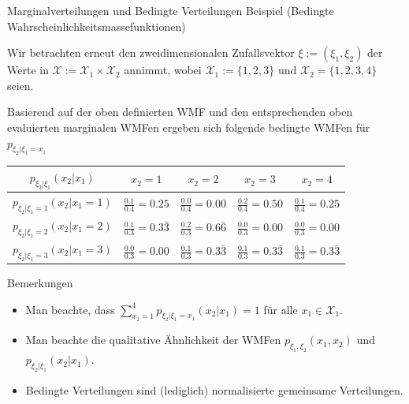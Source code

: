 \documentclass[
  8pt,
  ignorenonframetext,
]{beamer}
\providecommand{\tightlist}{%
  \setlength{\itemsep}{0pt}\setlength{\parskip}{0pt}}
\begin{document}
\begin{frame}{Marginalverteilungen und Bedingte Verteilungen}
\protect\hypertarget{marginalverteilungen-und-bedingte-verteilungen-5}{}
Beispiel (Bedingte Wahrscheinlichkeitsmassefunktionen)

\vspace{2mm}

\small
\justifying

Wir betrachten erneut den zweidimensionalen Zufallsvektor
\(\xi:= (\xi_1,\xi_2)\) der Werte in
\(\mathcal{X} := \mathcal{X}_1 \times \mathcal{X}_2\) annimmt, wobei
\(\mathcal{X}_1 := \{1,2,3\}\) und \(\mathcal{X}_2 = \{1,2,3,4\}\)
seien.

Basierend auf der oben definierten WMF und den entsprechenden oben
evaluierten marginalen WMFen ergeben sich folgende bedingte WMFen für
\(p_{\xi_2|\xi_1 = x_1}\) \vspace{1mm}

\renewcommand{\arraystretch}{1.4}
\begin{center}
\begin{tabular}{|c|cccc|}
\hline
$p_{\xi_2|\xi_1}(x_2|x_1)$
&   $x_2 = 1$
&   $x_2 = 2$
&   $x_2 = 3$
&   $x_2 = 4$
\\\hline
$p_{\xi_2|\xi_1 = 1}(x_2|x_1 = 1)$

&   $\frac{0.1}{0.4} = 0.25$

&   $\frac{0.0}{0.4} = 0.00$

&   $\frac{0.2}{0.4} = 0.50$

&   $\frac{0.1}{0.4} = 0.25$
\\
$p_{\xi_2|\xi_1 = 2}(x_2|x_1 = 2)$

&   $\frac{0.1}{0.3} = 0.3\bar{3}$

&   $\frac{0.2}{0.3} = 0.6\bar{6}$

&   $\frac{0.0}{0.3} = 0.00$

&   $\frac{0.0}{0.3} = 0.00$
\\
$p_{\xi_2|\xi_1 = 3}(x_2|x_1 = 3)$

&   $\frac{0.0}{0.3} = 0.00$

&   $\frac{0.1}{0.3} = 0.3\bar{3}$

&   $\frac{0.1}{0.3} = 0.3\bar{3}$

&   $\frac{0.1}{0.3} = 0.3\bar{3}$
\\\hline
\end{tabular}
\end{center}

\footnotesize

Bemerkungen

\begin{itemize}
\tightlist
\item
  Man beachte, dass
  \(\sum_{x_2 = 1}^4 p_{\xi_2|\xi_1 = x_1}(x_2|x_1) = 1\) für alle
  \(x_1 \in \mathcal{X}_1\).
\item
  Man beachte die qualitative Ähnlichkeit der WMFen
  \(p_{\xi_1,\xi_2}(x_1,x_2)\) und \(p_{\xi_2|\xi_1}(x_2|x_1)\).
\item
  Bedingte Verteilungen sind (lediglich) normalisierte gemeinsame
  Verteilungen.
\end{itemize}
\end{frame}
\end{document}
